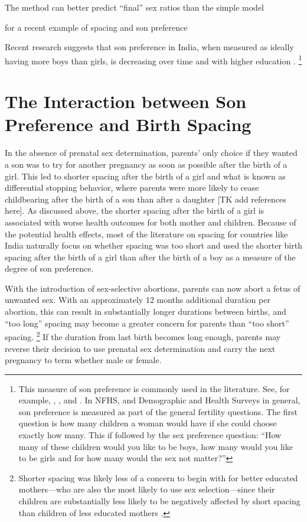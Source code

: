 \documentclass[12pt,letterpaper]{article}
\begin{document}
The method can better predict ``final'' sex ratios than the simple model


\citep{Soest2012} for a recent example of spacing and son preference


Recent research suggests that son preference in India, when measured as ideally having 
more boys than girls, is decreasing over time and with higher education \citep{bhat03,pande07}.%
\footnote{
This measure of son preference is commonly used in the literature. 
See, for example, \citet{clark00}, \citet{Jensen2009}, and \cite{Hu2015}.
In NFHS, and Demographic and Health Surveys in general, son preference is measured as part 
of the general fertility questions.
The first question is how many children a woman would have if she could choose exactly how 
many.
This if followed by the sex preference question:
``How many of these children would you like to be boys, how many would you like to be girls 
and for how many would the sex not matter?''
}


\section{The Interaction between Son Preference and Birth Spacing\label{sec:model}}

In the absence of prenatal sex determination, parents' only choice if they 
wanted a son was to try for another pregnancy as soon as possible after
the birth of a girl. 
This led to shorter spacing after the birth of a girl and what
is known as differential stopping behavior, where parents were 
more likely to cease childbearing after the birth of a son than
after a daughter [TK add references here]. 
As discussed above, the shorter spacing after the birth of a girl is 
associated with worse health outcomes for both mother and children.
Because of the potential health effects, most of the literature on spacing 
for countries like India naturally focus on whether spacing was too short
and used the shorter birth spacing after the birth of a girl than after the
birth of a boy as a measure of the degree of son preference.

With the introduction of sex-selective abortions, parents can now abort
a fetus of unwanted sex.
With an approximately 12 months additional duration per abortion,
this can result in substantially longer durations between births, and
``too long'' spacing may become a greater concern for parents than 
``too short'' spacing.%
\footnote{
Shorter spacing was likely less of a concern to begin with for
better educated mothers---who are also the most likely to use 
sex selection---since their children are substantially less likely 
to be negatively affected by short spacing than children of less 
educated mothers \citep{Whitworth2002}.
}
If the duration from last birth becomes long enough, parents may 
reverse their decision to use prenatal sex determination
and carry the next pregnancy to term whether male or female.
\end{document}
